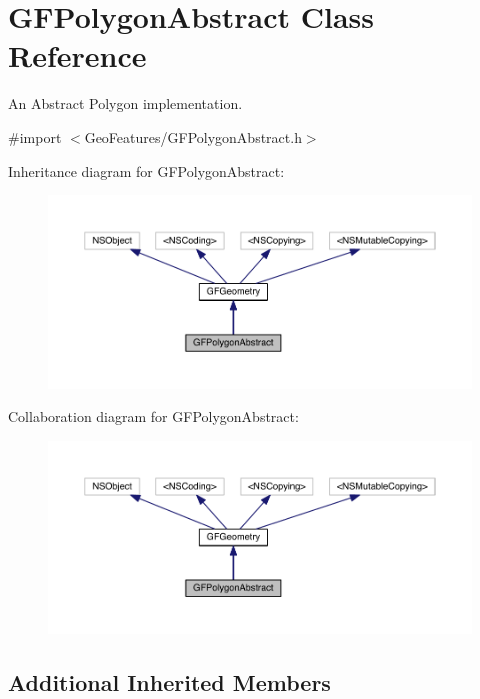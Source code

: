 \hypertarget{interface_g_f_polygon_abstract}{}\section{G\+F\+Polygon\+Abstract Class Reference}
\label{interface_g_f_polygon_abstract}


An Abstract Polygon implementation.  




{\ttfamily \#import $<$Geo\+Features/\+G\+F\+Polygon\+Abstract.\+h$>$}



Inheritance diagram for G\+F\+Polygon\+Abstract\+:
\nopagebreak
\begin{figure}[H]
\begin{center}
\leavevmode
\includegraphics[width=350pt]{interface_g_f_polygon_abstract__inherit__graph}
\end{center}
\end{figure}


Collaboration diagram for G\+F\+Polygon\+Abstract\+:
\nopagebreak
\begin{figure}[H]
\begin{center}
\leavevmode
\includegraphics[width=350pt]{interface_g_f_polygon_abstract__coll__graph}
\end{center}
\end{figure}
\subsection*{Additional Inherited Members}


